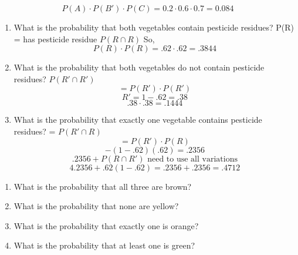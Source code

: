 \documentclass{report}
\begin{document}
$$P(A) \cdot P(B') \cdot P(C) = 0.2 \cdot 0.6 \cdot 0.7 = 0.084$$
\bigbreak \bigbreak \noindent
{}
\bigbreak \noindent
\pagebreak
\begin{enumerate}
  \item What is the probability that both vegetables contain pesticide residues? 
    \subitem P(R) = has pesticide residue
    \subitem $P(R \cap R)$
  So,
  $$P(R) \cdot P(R) = .62 \cdot .62 = .3844$$
  \item What is the probability that both vegetables do not contain pesticide residues?
    \subitem $P(R' \cap R')$
    $$ = P(R') \cdot P(R')$$
    $$ R' = 1 - .62 = .38$$
    $$ .38 \cdot .38 = .1444$$
  \item What is the probability that exactly one vegetable contains pesticide residues?
    \subitem = $P(R' \cap R)$
    $$ = P(R') \cdot P(R)$$
    $$ - (1-.62)(.62) = .2356$$
    $$ .2356 + P(R \cap R') \text{ need to use all variations}$$
    $$4 .2356 + .62(1-.62) = .2356 + .2356 = .4712$$
\end{enumerate}
\pagebreak
{}
\bigbreak \noindent
\begin{enumerate}
  \item What is the probability that all three are brown? 
  \item What is the probability that none are yellow?
  \item What is the probability that exactly one is orange?
  \item What is the probability that at least one is green?
\end{enumerate}
\end{document}
